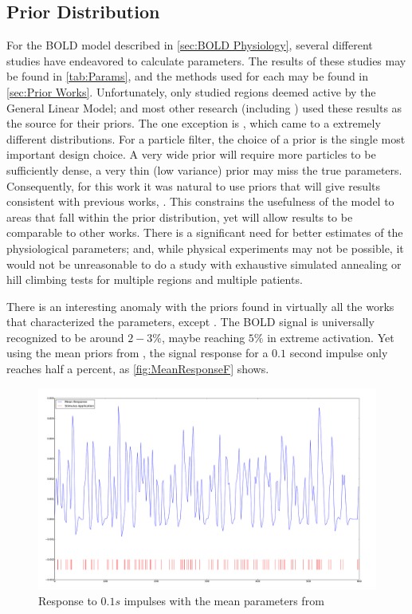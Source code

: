 \subsection{Prior Distribution}
\label{sec:PriorDist}
For the BOLD model described in \autoref{sec:BOLD Physiology}, several
different studies have endeavored to calculate parameters. The results
of these studies may be found in \autoref{tab:Params}, and the methods 
used for each may be found in \autoref{sec:Prior Works}. Unfortunately,
\cite{Friston2000} only studied regions deemed active by the General 
Linear Model; and most other research (including \cite{Friston2001}) used these results as 
the source for their priors. 
The one exception is \cite{Johnston2008}, which came to a extremely different
distributions. For a particle filter, the choice of a prior is
the single most important design choice. A very wide prior will require
more particles to be sufficiently dense, a very thin (low variance) prior may miss
the true parameters. Consequently, for this work it was natural
to use priors that will give results consistent with previous works, 
\cite{Friston2000}. This constrains the usefulness of the model to
areas that fall within the prior distribution, yet will allow results
to be comparable to other works. There is a significant need for better
estimates of the physiological parameters; and, while physical experiments
may not be possible, it would not be unreasonable to do a study with
exhaustive simulated annealing or hill climbing tests for multiple
regions and multiple patients.

There is an interesting anomaly with the priors found in virtually all
the works that characterized the parameters, except \cite{Johnston2008}.
The BOLD signal is universally recognized to be around $2-3\%$, maybe
reaching $5\%$ in extreme activation. Yet using the mean priors
from \cite{Friston2000}, the signal response for a $0.1$ second
impulse only reaches half a percent, as \autoref{fig:MeanResponseF}
shows.

\begin{figure}
\centering
\includegraphics[trim=6cm 3cm 6cm 3cm,width=16cm]{images/mean_response}
\caption{Response to $0.1s$ impulses with the mean parameters from \cite{Friston2000}}
\label{fig:MeanResponseF}
\end{figure}

